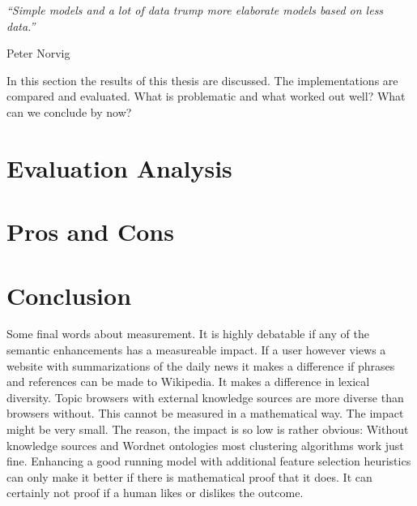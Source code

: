 \epigraph{\emph{
  ``Simple models and a lot of data trump more elaborate models based on less data.''
}}{ Peter Norvig }

In this section the results of this thesis are discussed. The implementations are compared and evaluated. What is problematic and what worked out well? What can we conclude by now?

\section{Evaluation Analysis}
\section{Pros and Cons}
\section{Conclusion}
  Some final words about measurement. It is highly debatable if any of the semantic enhancements has a measureable impact. If a user however views a website with summarizations of the daily news it makes a difference if phrases and references can be made to Wikipedia. It makes a difference in lexical diversity. Topic browsers with external knowledge sources are more diverse than browsers without. This cannot be measured in a mathematical way. The impact might be very small. The reason, the impact is so low is rather obvious: Without knowledge sources and Wordnet ontologies most clustering algorithms work just fine. Enhancing a good running model with additional feature selection heuristics can only make it better if there is mathematical proof that it does. It can certainly not proof if a human likes or dislikes the outcome.


